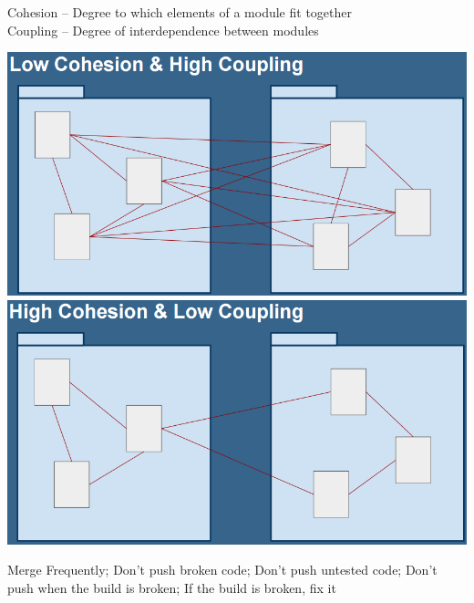 \documentclass[number]{assignment}
\begin{document}
\begin{landscape}
\headfoot
\begin{multicols}{3}


\small Cohesion -- Degree to which elements of a module fit together\\
\small Coupling -- Degree of interdependence between modules\\
\begin{multicols}{2}
\includegraphics[width=\linewidth]{LowCHighC.png}
\includegraphics[width=\linewidth]{HighCLowC.png}
\end{multicols}

\small Merge Frequently; Don't push broken code; Don't push untested code; Don't push when the build is broken; If the build is broken, fix it\\


\end{multicols}
\end{landscape}
\end{document}
